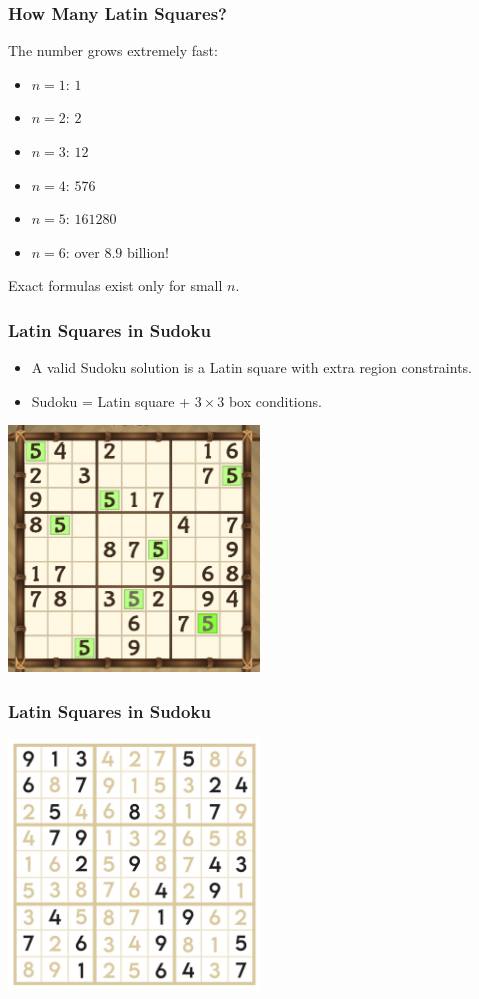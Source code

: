 \documentclass{beamer}
\begin{document}
\begin{frame}
\frametitle{How Many Latin Squares?}
The number grows extremely fast:
\begin{itemize}
  \item $n = 1$: $1$
  \item $n = 2$: $2$
  \item $n = 3$: $12$
  \item $n = 4$: $576$
  \item $n = 5$: $161280$
  \item $n = 6$: over $8.9$ billion!
\end{itemize}
\pause
Exact formulas exist only for small $n$.
\end{frame}

\begin{frame}
\frametitle{Latin Squares in Sudoku}
\begin{itemize}
  \item A valid Sudoku solution is a Latin square with extra region constraints.
  \item Sudoku = Latin square + $3\times3$ box conditions.
\end{itemize}
\begin{center}
\includegraphics[width=0.5\textwidth]{img8}
\end{center}
\end{frame}

\begin{frame}
\frametitle{Latin Squares in Sudoku}
\begin{center}
\includegraphics[width=0.5\textwidth]{img9}
\end{center}
\end{frame}
\end{document}
